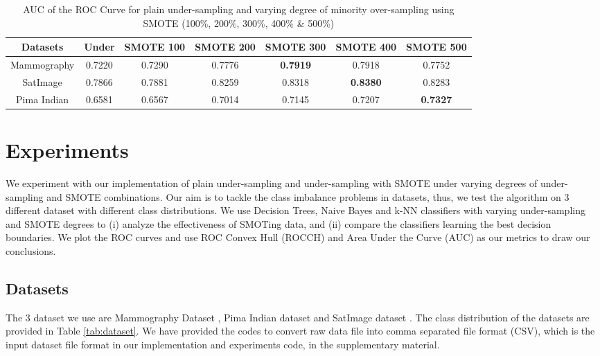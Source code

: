 \documentclass[10pt,journal,compsoc]{IEEEtran}
\begin{document}
\begin{table}[t]
    \centering
    \begin{tabular}{|c||c|c|c|c|c|c|}
    	\hline
         Datasets & Under & SMOTE 100 & SMOTE 200 & SMOTE 300 & SMOTE 400 & SMOTE 500  \\ \hline \hline  
        Mammography &  0.7220 & 0.7290 & 0.7776 & \textbf{0.7919} & 0.7918 & 0.7752 \\ \hline
        SatImage & 0.7866 & 0.7881 & 0.8259 & 0.8318 & \textbf{0.8380} & 0.8283 \\ \hline 
        Pima Indian & 0.6581 & 0.6567 & 0.7014 &  0.7145 & 0.7207 & \textbf{0.7327} \\ \hline
    \end{tabular}
    \caption{AUC of the ROC Curve for plain under-sampling and varying degree of minority over-sampling using SMOTE (100\%, 200\%, 300\%, 400\% \& 500\%)}
    \label{tab:auc}
\end{table}


\section{Experiments}
\label{sec:exp}
We experiment with our implementation of plain under-sampling and under-sampling with SMOTE under varying degrees of under-sampling and SMOTE combinations.   
Our aim is to tackle the class imbalance problems in datasets, thus, we test the algorithm on 3 different dataset with different class distributions.
We use Decision Trees, Naive Bayes and k-NN classifiers with varying under-sampling and SMOTE degrees to (i) analyze the effectiveness of SMOTing data, and (ii) compare the classifiers learning the best decision boundaries.
We plot the ROC curves and use ROC Convex Hull (ROCCH) and Area Under the Curve (AUC) as our metrics to draw our conclusions.
\subsection{Datasets}
The 3 dataset we use are Mammography Dataset \cite{mammo}, Pima Indian dataset \cite{pima} and SatImage dataset \cite{satimg}.
The class distribution of the datasets are provided in Table \ref{tab:dataset}.
We have provided the codes to convert raw data file into comma separated file format (CSV), which is the input dataset file format in our implementation and experiments code, in the supplementary material. 
\end{document}

